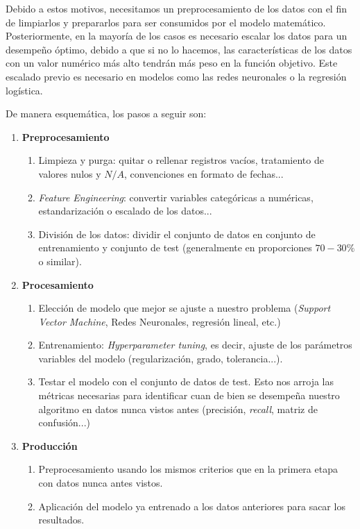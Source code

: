 Debido a estos motivos, necesitamos un preprocesamiento de los datos con el fin de limpiarlos y 
prepararlos para ser consumidos por el modelo matemático.\\
Posteriormente, en la mayoría de los casos es necesario escalar los datos para un desempeño óptimo, 
debido a que si no lo hacemos, las características de los datos con un valor numérico más alto 
tendrán más peso en la función objetivo. Este escalado previo es necesario en modelos como 
las redes neuronales o la regresión logística.

\clearpage

\noindent De manera esquemática, los pasos a seguir son:
\begin{framed}
\begin{enumerate}
  \item \textbf{Preprocesamiento}
  \begin{enumerate}
    \item Limpieza y purga: quitar o rellenar registros vacíos, tratamiento de valores nulos 
          y $N/A$, convenciones en formato de fechas...
    \item \textit{Feature Engineering}: convertir variables categóricas a numéricas, 
          estandarización o escalado de los datos...
    \item División de los datos: dividir el conjunto de datos en conjunto de entrenamiento y 
          conjunto de test (generalmente en proporciones $70 - 30\%$ o similar).
  \end{enumerate}
  
  \item \textbf{Procesamiento}
  \begin{enumerate}
    \item Elección de modelo que mejor se ajuste a nuestro problema 
          (\textit{Support Vector Machine}, Redes Neuronales, regresión lineal, etc.)
    \item Entrenamiento: \textit{Hyperparameter tuning}, 
          es decir, ajuste de los parámetros variables del modelo (regularización, grado, tolerancia...).
    \item Testar el modelo con el conjunto de datos de test. Esto nos arroja las métricas necesarias
    para identificar cuan de bien se desempeña nuestro algoritmo en datos nunca vistos antes 
    (precisión, \textit{recall}, matriz de confusión...)
  \end{enumerate}
  
  \item \textbf{Producción}
  \begin{enumerate}
    \item Preprocesamiento usando los mismos criterios que en la primera etapa con datos nunca 
          antes vistos.
    \item Aplicación del modelo ya entrenado a los datos anteriores para sacar los resultados.
  \end{enumerate}
\end{enumerate}
\end{framed}

